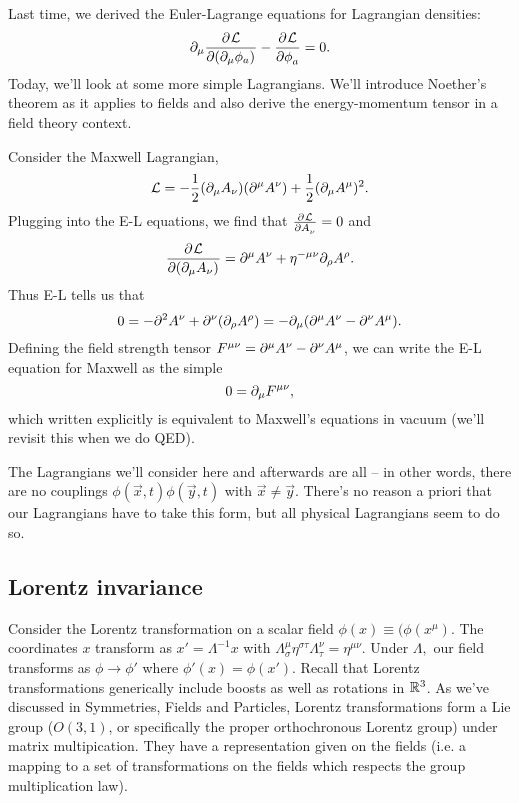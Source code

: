 Last time, we derived the Euler-Lagrange equations for Lagrangian densities:
\begin{equation}
\partial_\mu \frac{\partial^{} \mathcal{L}}{\partial (\partial_\mu \phi_a) ^{}}-\frac{\partial^{} \mathcal{L}}{\partial \phi_a ^{}}=0.
\end{equation}
Today, we'll look at some more simple Lagrangians. We'll introduce Noether's theorem as it applies to fields and also derive the energy-momentum tensor in a field theory context.

\begin{exm}
Consider the Maxwell Lagrangian,
\begin{equation}
\mathcal{L}=-\frac{1}{2}(\partial_\mu A_\nu)(\partial^\mu A^\nu)+\frac{1}{2}(\partial_\mu A^\mu)^2.
\end{equation}
Plugging into the E-L equations, we find that $\frac{\partial^{} \mathcal L}{\partial A_\nu ^{}}=0$ and
\begin{equation}
\frac{\partial^{} \mathcal L}{\partial (\partial_\mu A_\nu) ^{}}=\partial^\mu A^\nu +\eta^{-\mu\nu}\partial_\rho A^\rho.
\end{equation}
Thus E-L tells us that
\begin{equation}
0=-\partial^2 A^\nu+\partial^\nu (\partial_\rho A^\rho)=-\partial_\mu(\partial^\mu A^\nu-\partial^\nu A^\mu).
\end{equation}
Defining the field strength tensor $F^{\mu\nu}=\partial^\mu A^\nu-\partial^\nu A^\mu$, we can write the E-L equation for Maxwell as the simple
$$0=\partial_\mu F^{\mu\nu},$$
which written explicitly is equivalent to Maxwell's equations in vacuum (we'll revisit this when we do QED).
\end{exm}

The Lagrangians we'll consider here and afterwards are all -- in other words, there are no couplings $\phi(\vec{x},t)\phi(\vec{y},t)$ with $\vec{x}\neq \vec{y}$. There's no reason a priori that our Lagrangians have to take this form, but all physical Lagrangians seem to do so.

\subsection*{Lorentz invariance} Consider the Lorentz transformation on a scalar field $\phi(x)\equiv (\phi (x^\mu)$. The coordinates $x$ transform as $x'=\Lambda^{-1} x$ with $\Lambda^\mu_\sigma \eta^{\sigma\tau}\Lambda_\tau^\nu = \eta^{\mu\nu}$. Under $\Lambda,$ our field transforms as $\phi\to \phi'$ where $\phi'(x)=\phi(x')$. Recall that Lorentz transformations generically include boosts as well as rotations in $\mathbb{R}^3$. As we've discussed in Symmetries, Fields and Particles, Lorentz transformations form a Lie group ($O(3,1)$, or specifically the proper orthochronous Lorentz group) under matrix multipication. They have a representation given on the fields (i.e. a mapping to a set of transformations on the fields which respects the group multiplication law).

